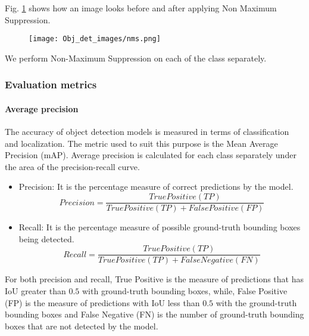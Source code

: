Fig. \ref{non-max} shows how an image looks before and after applying Non Maximum Suppression. 

\begin{figure}[h!]
    \centering
    \texttt{[image: Obj\_det\_images/nms.png]}
    \caption{\cite{Nms}}
    \label{non-max}
\end{figure}

We perform Non-Maximum Suppression on each of the class separately. 

\newpage


\subsubsection{Evaluation metrics}

\paragraph{Average precision}

The accuracy of object detection models is measured in terms of classification and localization. The metric used to suit this purpose is the Mean Average Precision (mAP). Average precision is calculated for each class separately under the area of the precision-recall curve. 
\par
\begin{itemize}
    \item Precision: It is the percentage measure of correct predictions by the model.
    \begin{equation}
        Precision = \frac{True Positive (TP)}{True Positive (TP) + False Positive (FP)}
    \end{equation}
    \item Recall: It is the percentage measure of possible ground-truth bounding boxes being detected. 
    \begin{equation}
        Recall = \frac{True Positive (TP)}{True Positive (TP) + False Negative (FN)}
    \end{equation}
\end{itemize}

For both precision and recall, True Positive is the measure of predictions that has IoU greater than $0.5$ with ground-truth bounding boxes, while, False Positive (FP) is the measure of predictions with IoU less than $0.5$ with the ground-truth bounding boxes and False Negative (FN) is the number of ground-truth bounding boxes that are not detected by the model. 

